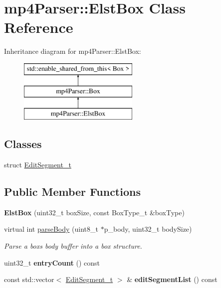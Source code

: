 \hypertarget{classmp4_parser_1_1_elst_box}{}\section{mp4\+Parser\+::Elst\+Box Class Reference}
\label{classmp4_parser_1_1_elst_box}
Inheritance diagram for mp4\+Parser\+::Elst\+Box\+:\begin{figure}[H]
\begin{center}
\leavevmode
\includegraphics[height=3.000000cm]{classmp4_parser_1_1_elst_box}
\end{center}
\end{figure}
\subsection*{Classes}
\begin{DoxyCompactItemize}
\item 
struct \mbox{\hyperlink{structmp4_parser_1_1_elst_box_1_1_edit_segment__t}{Edit\+Segment\+\_\+t}}
\end{DoxyCompactItemize}
\subsection*{Public Member Functions}
\begin{DoxyCompactItemize}
\item 
\mbox{\label{classmp4_parser_1_1_elst_box_ab5f2dbbff7fceca938c5bcfa3530f3cd}} 
{\bfseries Elst\+Box} (uint32\+\_\+t box\+Size, const Box\+Type\+\_\+t \&box\+Type)
\item 
virtual int \mbox{\hyperlink{classmp4_parser_1_1_elst_box_a86d32e797d78cf7c00b81e2e34751324}{parse\+Body}} (uint8\+\_\+t $\ast$p\+\_\+body, uint32\+\_\+t body\+Size)
\begin{DoxyCompactList}\small\item\em Parse a box\textquotesingle{}s body buffer into a box structure. \end{DoxyCompactList}\item 
\mbox{\label{classmp4_parser_1_1_elst_box_accaf636deb7cdce5a362593f5fd3f312}} 
uint32\+\_\+t {\bfseries entry\+Count} () const
\item 
\mbox{\label{classmp4_parser_1_1_elst_box_aceeea8579bbd94f0369966ba2ab35787}} 
const std\+::vector$<$ \mbox{\hyperlink{structmp4_parser_1_1_elst_box_1_1_edit_segment__t}{Edit\+Segment\+\_\+t}} $>$ \& {\bfseries edit\+Segment\+List} () const
\end{DoxyCompactItemize}
